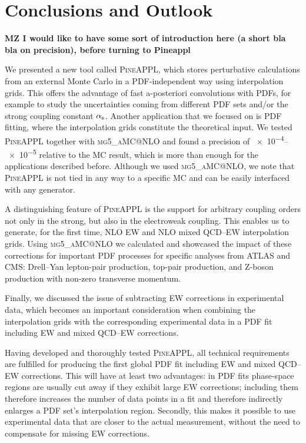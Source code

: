 \section{Conclusions and Outlook}
\label{sec:conclusion}
{\bf MZ I would like to have some sort of introduction here (a short bla bla on precision), before turning to Pineappl}

We presented a new tool called \textsc{PineAPPL}, which stores perturbative calculations from an external Monte Carlo in a PDF-independent way using interpolation grids.
This offers the advantage of fast a-posteriori convolutions with PDFs, for example to study the uncertainties coming from different PDF sets and/or the strong coupling constant $\alpha_\mathrm{s}$.
Another application that we focused on is PDF fitting, where the interpolation grids constitute the theoretical input.
We tested \textsc{PineAPPL} together with \textsc{mg5\_aMC@NLO} and found a precision of \numrange{e-4}{e-5} relative to the MC result, which is more than enough for the applications described before.
Although we used \textsc{mg5\_aMC@NLO}, we note that \textsc{PineAPPL} is not tied in any way to a specific MC and can be easily interfaced with any generator.

A distinguishing feature of \textsc{PineAPPL} is the support for arbitrary coupling orders not only in the strong, but also in the electroweak coupling.
This enables us to generate, for the first time, NLO EW and NLO mixed QCD--EW interpolation grids.
Using \textsc{mg5\_aMC@NLO} we calculated and showcased the impact of these corrections for important PDF processes for specific analyses from ATLAS and CMS: Drell--Yan lepton-pair production, top-pair production, and Z-boson production with non-zero transverse momentum.

Finally, we discussed the issue of subtracting EW corrections in experimental data, which becomes an important consideration when combining the interpolation grids with the corresponding experimental data in a PDF fit including EW and mixed QCD--EW corrections.

Having developed and thoroughly tested \textsc{PineAPPL}, all technical requirements are fulfilled for producing the first global PDF fit including EW and mixed QCD--EW corrections.
This will have at least two advantages: in PDF fits phase-space regions are usually cut away if they exhibit large EW corrections; including them therefore increases the number of data points in a fit and therefore indirectly enlarges a PDF set's interpolation region.
Secondly, this makes it possible to use experimental data that are closer to the actual measurement, without the need to compensate for missing EW corrections.
